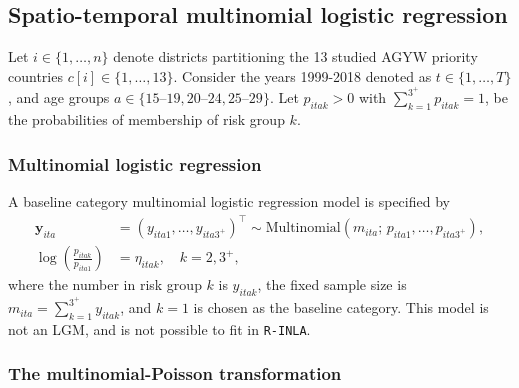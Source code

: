 \documentclass[a4paper, nobind]{templates/ociamthesis}
\newcommand{\y}{\mathbf{y}}
\begin{document}
\hypertarget{st-multinomial}{%
\subsection{Spatio-temporal multinomial logistic regression}\label{st-multinomial}}

Let \(i \in \{1, \ldots, n\}\) denote districts partitioning the 13 studied AGYW priority countries \(c[i] \in \{1, \ldots, 13\}\).
Consider the years 1999-2018 denoted as \(t \in \{1, \ldots, T\}\), and age groups \(a \in \{\text{15--19}, \text{20--24}, \text{25--29}\}\).
Let \(p_{itak} > 0\) with \(\sum_{k = 1}^{3^{+}} p_{itak} = 1\), be the probabilities of membership of risk group \(k\).

\hypertarget{multinomial-logistic-regression}{%
\subsubsection{Multinomial logistic regression}\label{multinomial-logistic-regression}}

A baseline category multinomial logistic regression model is specified by
\begin{align}
    \y_{ita} &= (y_{ita1}, \ldots, y_{ita3^{+}})^\top \sim \text{Multinomial}(m_{ita}; \, p_{ita1}, \ldots, p_{ita3^{+}}), \\
    \log \left( \frac{p_{itak}}{p_{ita1}} \right) &= \eta_{itak}, \quad k = 2, 3^{+},
\end{align}
where the number in risk group \(k\) is \(y_{itak}\), the fixed sample size is \(m_{ita} = \sum_{k = 1}^{3^{+}} y_{itak}\), and \(k = 1\) is chosen as the baseline category.
This model is not an LGM, and is not possible to fit in \texttt{R-INLA}.

\hypertarget{the-multinomial-poisson-transformation}{%
\subsubsection{The multinomial-Poisson transformation}\label{the-multinomial-poisson-transformation}}
\end{document}
